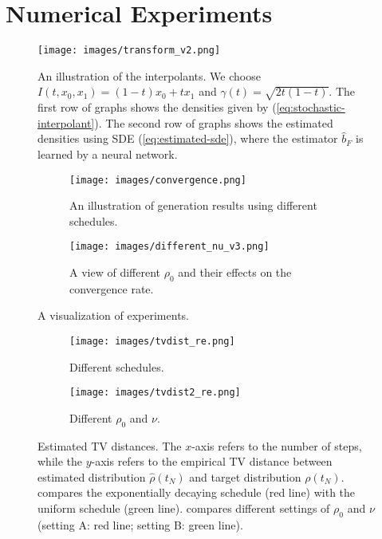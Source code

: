 % 
\section{Numerical Experiments}
\label{sec:experiments}

\begin{figure}[tb]
    \centering
    \texttt{[image: images/transform\_v2.png]}
    \caption{An illustration of the interpolants. We choose $I(t,x_0,x_1)=(1-t)x_0+tx_1$ and $\gamma(t)=\sqrt{2t(1-t)}$. The first row of graphs shows the densities given by (\ref{eq:stochastic-interpolant}). The second row of graphs shows the estimated densities using SDE (\ref{eq:estimated-sde}), where the estimator $\hat{b}_F$ is learned by a neural network.}
    \label{fig:1}
\end{figure}

% 
\begin{figure}[htb]
    \centering
    \begin{subfigure}[b]{0.45\linewidth}
        \texttt{[image: images/convergence.png]}
        \caption{An illustration of generation results using different schedules.}
        \label{fig:2}
    \end{subfigure}\quad
    \begin{subfigure}[b]{0.45\linewidth}
        \texttt{[image: images/different\_nu\_v3.png]}
        \caption{A view of different $\rho_0$ and their effects on the convergence rate.}
        \label{fig:4}
    \end{subfigure}
    \caption{A visualization of experiments.}
    \label{fig:2-3}
\end{figure}

\begin{figure}[htb]
    \centering
    \begin{subfigure}[b]{0.45\linewidth}
        \texttt{[image: images/tvdist\_re.png]}
        \caption{Different schedules. }
        \label{fig:3}
    \end{subfigure}
    \begin{subfigure}[b]{0.45\linewidth}
        \texttt{[image: images/tvdist2\_re.png]}
        \caption{Different $\rho_0$ and $\nu$.}
        \label{fig:5}
    \end{subfigure}
    \caption{Estimated TV distances. The $x$-axis refers to the number of steps, while the $y$-axis refers to the empirical TV distance between estimated distribution $\hat{\rho}(t_N)$ and target distribution $\rho(t_N)$.  compares the exponentially decaying schedule (red line) with the uniform schedule (green line).  compares different settings of $\rho_0$ and $\nu$ (setting A: red line; setting B: green line).}
    \label{fig:4-5}
\end{figure}


